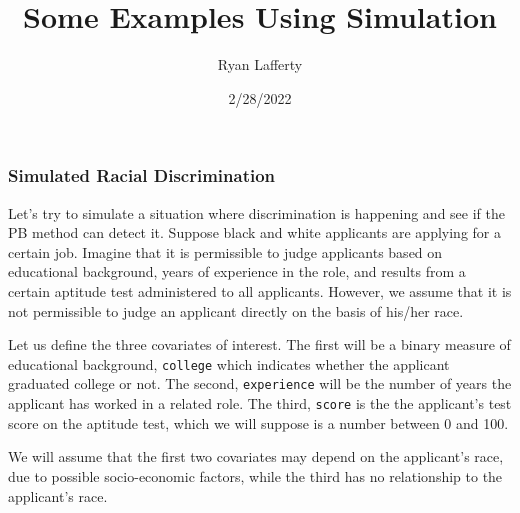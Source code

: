 \documentclass[
]{article}
\title{Some Examples Using Simulation}
\author{Ryan Lafferty}
\date{2/28/2022}
\begin{document}
\maketitle

\hypertarget{simulated-racial-discrimination}{%
\subsubsection{Simulated Racial
Discrimination}\label{simulated-racial-discrimination}}

Let's try to simulate a situation where discrimination is happening and
see if the PB method can detect it. Suppose black and white applicants
are applying for a certain job. Imagine that it is permissible to judge
applicants based on educational background, years of experience in the
role, and results from a certain aptitude test administered to all
applicants. However, we assume that it is not permissible to judge an
applicant directly on the basis of his/her race.

Let us define the three covariates of interest. The first will be a
binary measure of educational background, \texttt{college} which
indicates whether the applicant graduated college or not. The second,
\texttt{experience} will be the number of years the applicant has worked
in a related role. The third, \texttt{score} is the the applicant's test
score on the aptitude test, which we will suppose is a number between 0
and 100.

We will assume that the first two covariates may depend on the
applicant's race, due to possible socio-economic factors, while the
third has no relationship to the applicant's race.
\end{document}
